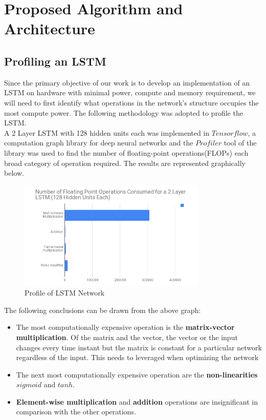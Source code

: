 \chapter{Proposed Algorithm and Architecture}
\label{paaa}
\section{Profiling an LSTM}
Since the primary objective of our work is to develop an implementation of an LSTM on hardware with minimal power, compute and memory requirement, we will need to first identify what operations in the network's structure occupies the most compute power. The following methodology was adopted to profile the LSTM.\\
A 2 Layer LSTM with 128 hidden units each was implemented in $Tensorflow$, a computation graph library for deep neural networks and the $Profiler$ tool of the library was used to find the number of floating-point operations(FLOPs) each broad category of operation required. The results are represented graphically below.

\begin{figure}[h]
\caption{Profile of LSTM Network}
\centering
\includegraphics[width=0.8\textwidth]{profile}
\end{figure}

The following conclusions can be drawn from the above graph:
\begin{itemize}
    \item The most computationally expensive operation is the \textbf{matrix-vector multiplication}. Of the matrix and the vector, the vector or the input changes every time instant but the matrix is constant for a particular network regardless of the input. This needs to leveraged when optimizing the network
    \item The next most computationally expensive operation are the \textbf{non-linearities} $sigmoid$ and $tanh$.
    \item \textbf{Element-wise multiplication} and \textbf{addition} operations are insignificant in comparison with the other operations.
\end{itemize}

